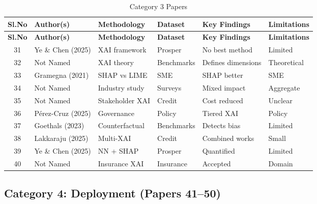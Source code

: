 \begin{longtable}{c p{} p{} p{} p{} p{}}
\caption{Category 3 Papers} \\
\toprule
\textbf{Sl.No} & \textbf{Author(s)} & \textbf{Methodology} & \textbf{Dataset} & \textbf{Key Findings} & \textbf{Limitations} \\
\midrule
\endfirsthead
\toprule
\textbf{Sl.No} & \textbf{Author(s)} & \textbf{Methodology} & \textbf{Dataset} & \textbf{Key Findings} & \textbf{Limitations} \\
\midrule
\endhead

31 & Ye \& Chen (2025) & XAI framework & Prosper & No best method & Limited \\
32 & Not Named & XAI theory & Benchmarks & Defines dimensions & Theoretical \\
33 & Gramegna (2021) & SHAP vs LIME & SME & SHAP better & SME \\
34 & Not Named & Industry study & Surveys & Mixed impact & Aggregate \\
35 & Not Named & Stakeholder XAI & Credit & Cost reduced & Unclear \\
36 & Pérez-Cruz (2025) & Governance & Policy & Tiered XAI & Policy \\
37 & Goethals (2023) & Counterfactual & Benchmarks & Detects bias & Limited \\
38 & Lakkaraju (2025) & Multi-XAI & Credit & Combined works & Small \\
39 & Ye \& Chen (2025) & NN + SHAP & Prosper & Quantified & Limited \\
40 & Not Named & Insurance XAI & Insurance & Accepted & Domain \\
\bottomrule
\end{longtable}

\subsection{Category 4: Deployment (Papers 41--50)}

